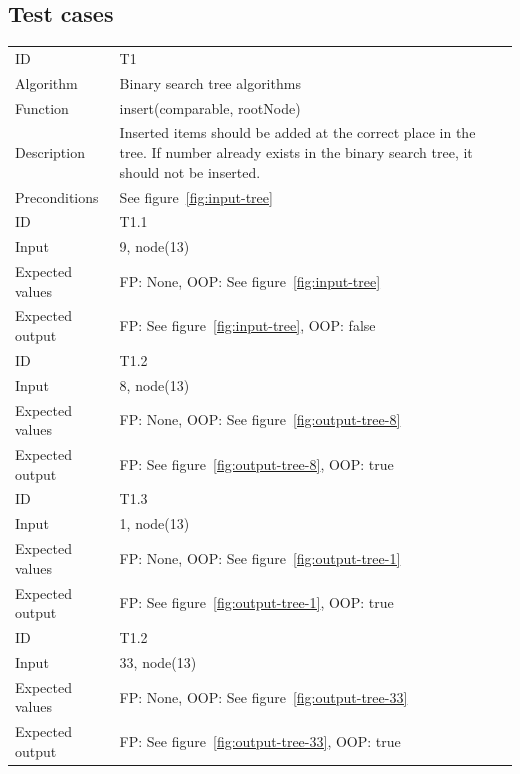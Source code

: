 \documentclass {article}
\begin{document}
\subsection{Test cases}
\begin{tabular}{ | l p{10cm} | }
\hline
ID & T1 \\
Algorithm & Binary search tree algorithms \\
Function & insert(comparable, rootNode) \\
Description & Inserted items should be added at the correct place in the tree. If number already exists in the binary search tree, it should not be inserted. \\
Preconditions & See figure~\ref{fig:input-tree} \\
\hline
ID & T1.1 \\
Input & 9, node(13) \\
Expected values & FP: None, OOP: See figure~\ref{fig:input-tree} \\
Expected output & FP: See figure~\ref{fig:input-tree}, OOP: false \\
\hline
ID & T1.2 \\
Input & 8, node(13) \\
Expected values & FP: None, OOP: See figure~\ref{fig:output-tree-8} \\
Expected output & FP: See figure~\ref{fig:output-tree-8}, OOP: true \\
\hline
ID & T1.3 \\
Input & 1, node(13) \\
Expected values & FP: None, OOP: See figure~\ref{fig:output-tree-1} \\
Expected output & FP: See figure~\ref{fig:output-tree-1}, OOP: true \\
\hline
ID & T1.2 \\
Input & 33, node(13) \\
Expected values & FP: None, OOP: See figure~\ref{fig:output-tree-33} \\
Expected output & FP: See figure~\ref{fig:output-tree-33}, OOP: true \\
\hline
\end{tabular}
\end{document}
